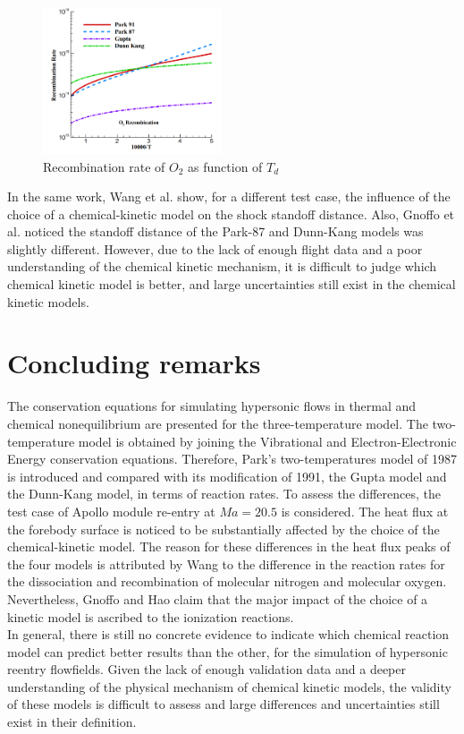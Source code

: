 \documentclass[11pt,a4paper,twocolumn]{article}
\begin{document}
\begin{figure}[h]
    \centering
    \includegraphics[width=0.47\textwidth]{myimages/O2recombination.png}
    \caption{Recombination rate of $O_2$ as function of $T_d$}
    \label{fig:o2recombination}
\end{figure}

In the same work, Wang et al. \cite{wang2017assessment} show, for a different test case, the influence of the choice of a chemical-kinetic model on the shock standoff distance. Also, Gnoffo et al. \cite{gnoffo1989conservation} noticed the standoff distance of the Park-87 and Dunn-Kang models was slightly different. However, due to the lack of enough flight data and a poor understanding of the chemical kinetic mechanism, it is difficult to judge which chemical kinetic model is better, and large uncertainties still exist in the chemical kinetic models. 
\section{Concluding remarks}
The conservation equations for simulating hypersonic flows in thermal and chemical nonequilibrium are presented for the three-temperature model. The two-temperature model is obtained by joining the Vibrational and Electron-Electronic Energy conservation equations. Therefore, Park's two-temperatures model of 1987 is introduced and compared with its modification of 1991, the Gupta model and the Dunn-Kang model, in terms of reaction rates. To assess the differences, the test case of Apollo module re-entry at $Ma=20.5$ is considered. The heat flux at the forebody surface is noticed to be substantially affected by the choice of the chemical-kinetic model. The reason for these differences in the heat flux peaks of the four models is attributed by Wang \cite{wang2017assessment} to the difference in the reaction rates for the dissociation and recombination of molecular nitrogen and molecular oxygen. Nevertheless, Gnoffo \cite{gnoffo1989conservation} and Hao \cite{hao2016numerical} claim that the major impact of the choice of a kinetic model is ascribed to the ionization reactions. \\
In general, there is still no concrete evidence to indicate which chemical reaction model can predict better results than the other, for the simulation of hypersonic reentry flowfields. Given the lack of enough validation data and a deeper understanding of the physical mechanism of chemical kinetic models, the validity of these models is difficult to assess and large differences and uncertainties still exist in their definition.
\end{document}
